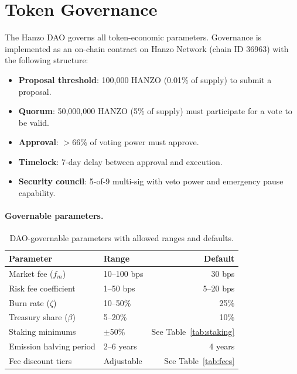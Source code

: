 \section{Token Governance}

\label{sec:tokengov}

The Hanzo DAO governs all token-economic parameters. Governance is implemented as
an on-chain contract on Hanzo Network (chain ID 36963) with the following
structure:

\begin{itemize}[leftmargin=1.1em]
    \item \textbf{Proposal threshold}: 100,000 HANZO (0.01\% of supply) to
    submit a proposal.
    \item \textbf{Quorum}: 50,000,000 HANZO (5\% of supply) must participate for
    a vote to be valid.
    \item \textbf{Approval}: $>$66\% of voting power must approve.
    \item \textbf{Timelock}: 7-day delay between approval and execution.
    \item \textbf{Security council}: 5-of-9 multi-sig with veto power and
    emergency pause capability.
\end{itemize}

\paragraph{Governable parameters.}

\begin{table}[H]
\centering
\small
\begin{tabular}{llr}
\toprule
\textbf{Parameter} & \textbf{Range} & \textbf{Default} \\
\midrule
Market fee ($f_m$) & 10--100 bps & 30 bps \\
Risk fee coefficient & 1--50 bps & 5--20 bps \\
Burn rate ($\zeta$) & 10--50\% & 25\% \\
Treasury share ($\beta$) & 5--20\% & 10\% \\
Staking minimums & $\pm$50\% & See Table~\ref{tab:staking} \\
Emission halving period & 2--6 years & 4 years \\
Fee discount tiers & Adjustable & See Table~\ref{tab:fees} \\
\bottomrule
\end{tabular}
\caption{DAO-governable parameters with allowed ranges and defaults.}
\label{tab:governance}
\end{table}

